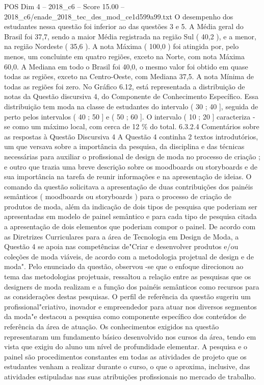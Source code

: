 \begin{textsample}{POS Dim 4 – 2018\_c6 – Score 15.00 – 2018\_c6/enade\_2018\_tec\_des\_mod\_ce1d599a99.txt}
O desempenho dos estudantes nessa questão foi inferior ao das questões 3 e 5.
A Média geral do Brasil foi 37,7, sendo a maior Média registrada na região Sul ( 40,2 ), e a menor, na região Nordeste ( 35,6 ).
A nota Máxima ( 100,0 ) foi atingida por, pelo menos, um concluinte em quatro regiões, exceto na Norte, com nota Máxima 60,0.
A Mediana em todo o Brasil foi 40,0, o mesmo valor foi obtido em quase todas as regiões, exceto na Centro-Oeste, com Mediana 37,5.
A nota Mínima de todas as regiões foi zero.
No Gráfico 6.12, está representada a distribuição de notas da Questão discursiva 4, do Componente de Conhecimento Específico.
Essa distribuição tem moda na classe de estudantes do intervalo ( 30 ; 40 ], seguida de perto pelos intervalos ( 40 ; 50 ] e ( 50 ; 60 ].
O intervalo ( 10 ; 20 ] caracteriza -se como um máximo local, com cerca de 12 \% do total. 6.3.2.4 Comentários sobre as respostas à Questão Discursiva 4 A Questão 4 continha 2 textos introdutórios, um que versava sobre a importância da pesquisa, da disciplina e das técnicas necessárias para auxiliar o profissional de design de moda no processo de criação ; e outro que trazia uma breve descrição sobre os moodboards ou storyboards e de sua importância na tarefa de reunir informações e na apresentação de ideias.
O comando da questão solicitava a apresentação de duas contribuições dos painéis semânticos ( moodboards ou storyboards ) para o processo de criação de produtos de moda, além da indicação de dois tipos de pesquisa que poderiam ser apresentadas em modelo de painel semântico e para cada tipo de pesquisa citada a apresentação de dois elementos que poderiam compor o painel.
De acordo com as Diretrizes Curriculares para a área de Tecnologia em Design de Moda, a Questão 4 se apoia nas competências de"Criar e desenvolver produtos e/ou coleções de moda viáveis, de acordo com a metodologia projetual de design e de moda".
Pelo enunciado da questão, observou -se que o enfoque direcionou ao tema das metodologias projetuais, ressaltou a relação entre as pesquisas que os designers de moda realizam e a função dos painéis semânticos como recursos para as considerações destas pesquisas.
O perfil de referência da questão sugeriu um profissional"criativo, inovador e empreendedor para atuar nos diversos segmentos da moda"e destacou a pesquisa como componente específico dos conteúdos de referência da área de atuação.
Os conhecimentos exigidos na questão representaram um fundamento básico desenvolvido nos cursos da área, tendo em vista que exigiu do aluno um nível de profundidade elementar.
A pesquisa e o painel são procedimentos constantes em todas as atividades de projeto que os estudantes venham a realizar durante o curso, o que o aproxima, inclusive, das atividades estipuladas nas suas atribuições profissionais no mercado de trabalho.

\end{textsample}
